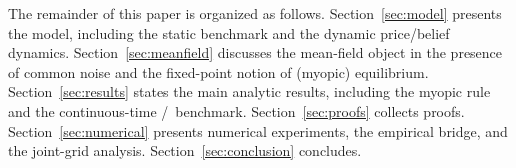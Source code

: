 The remainder of this paper is organized as follows. Section~\ref{sec:model} presents the model, including the static benchmark and the dynamic price/belief dynamics. Section~\ref{sec:meanfield} discusses the mean-field object in the presence of common noise and the fixed-point notion of (myopic) equilibrium. Section~\ref{sec:results} states the main analytic results, including the myopic rule and the continuous-time \CARA/\LQG\ benchmark. Section~\ref{sec:proofs} collects proofs. Section~\ref{sec:numerical} presents numerical experiments, the empirical bridge, and the joint-grid analysis. Section~\ref{sec:conclusion} concludes.
